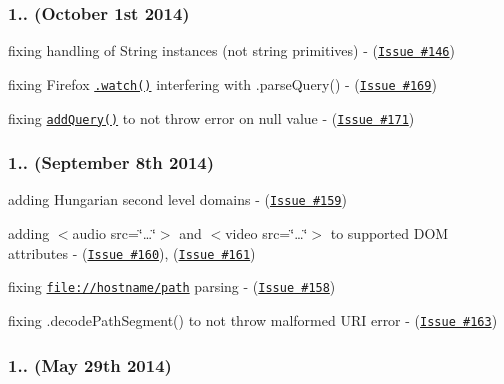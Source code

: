 \subsubsection*{1.. (October 1st 2014)}


\begin{DoxyItemize}
\item fixing handling of String instances (not string primitives) -\/ (\href{https://github.com/medialize/URI.js/issues/146}{\tt Issue \#146})
\item fixing Firefox \href{https://developer.mozilla.org/en-US/docs/Web/JavaScript/Reference/Global_Objects/Object/watch}{\tt {\ttfamily .watch()}} interfering with {\ttfamily .parse\+Query()} -\/ (\href{https://github.com/medialize/URI.js/issues/169}{\tt Issue \#169})
\item fixing \href{http://medialize.github.io/URI.js/docs.html#search-add}{\tt {\ttfamily add\+Query()}} to not throw error on null value -\/ (\href{https://github.com/medialize/URI.js/issues/171}{\tt Issue \#171})
\end{DoxyItemize}

\subsubsection*{1.. (September 8th 2014)}


\begin{DoxyItemize}
\item adding Hungarian second level domains -\/ (\href{https://github.com/medialize/URI.js/issues/159}{\tt Issue \#159})
\item adding {\ttfamily $<$audio src=\char`\"{}…\char`\"{}$>$} and {\ttfamily $<$video src=\char`\"{}…\char`\"{}$>$} to supported D\+OM attributes -\/ (\href{https://github.com/medialize/URI.js/issues/160}{\tt Issue \#160}), (\href{https://github.com/medialize/URI.js/issues/161}{\tt Issue \#161})
\item fixing {\ttfamily \href{file://hostname/path}{\tt file\+://hostname/path}} parsing -\/ (\href{https://github.com/medialize/URI.js/issues/158}{\tt Issue \#158})
\item fixing {\ttfamily .decode\+Path\+Segment()} to not throw malformed U\+RI error -\/ (\href{https://github.com/medialize/URI.js/issues/163}{\tt Issue \#163})
\end{DoxyItemize}

\subsubsection*{1.. (May 29th 2014)}



